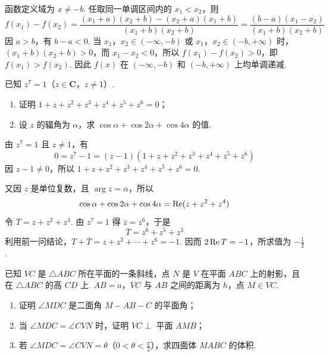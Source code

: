 \begin{solution}
函数定义域为 \(x\neq-b\). 任取同一单调区间内的 \(x_1<x_2\)，则
\[
f(x_1)-f(x_2)=\frac{(x_1+a)(x_2+b)-(x_2+a)(x_1+b)}{(x_1+b)(x_2+b)}=\frac{(b-a)(x_1-x_2)}{(x_1+b)(x_2+b)}
\]
因 \(a>b\)，有 \(b-a<0\). 当 \(x_1\)，\(x_2\in(-\infty,-b)\) 或 \(x_1\)，\(x_2\in(-b,+\infty)\) 时，\((x_1+b)(x_2+b)>0\)，而 \(x_1-x_2<0\)，所以 \(f(x_1)-f(x_2)>0\)，即 \(f(x_1)>f(x_2)\). 因此 \(f(x)\) 在 \((-\infty,-b)\) 和 \((-b,+\infty)\) 上均单调递减.
\end{solution}

\begin{problem}
已知 \(z^{7}=1\)（\(z\in\mathbf{C}\)，\(z\neq1\)）.
\begin{enumerate}
\item 证明 \(1 + z + z^2 + z^3 + z^4 + z^5 + z^6 = 0\)；
\item 设 \(z\) 的辐角为 \(\alpha\)，求 \(\cos \alpha + \cos 2\alpha + \cos 4\alpha\) 的值.
\end{enumerate}
\end{problem}

\begin{solution}
由 \(z^7=1\) 且 \(z\neq1\)，有
\[
0=z^7-1=(z-1)(1+z+z^2+z^3+z^4+z^5+z^6)
\]
因 \(z-1\neq0\)，所以 \(1+z+z^2+z^3+z^4+z^5+z^6=0\).

又因 \(z\) 是单位复数，且 \(\arg z=\alpha\)，所以
\[
\cos\alpha+\cos2\alpha+\cos4\alpha=\mathop{\rm Re}(z+z^2+z^4)
\]
令 \(T=z+z^2+z^4\). 由 \(z^7=1\) 得 \(\overline z=z^6\)，于是
\[
\overline T=z^6+z^5+z^3
\]
利用前一问结论，\(T+\overline T=z+z^2+\cdots+z^6=-1\). 因而 \(2\mathop{\rm Re}T=-1\)，所求值为 \(-\frac12\).
\end{solution}

\begin{problem}
已知 \(VC\) 是 \(\triangle ABC\) 所在平面的一条斜线，点 \(N\) 是 \(V\) 在平面 \(ABC\) 上的射影，且在 \(\triangle ABC\) 的高 \(CD\) 上. \(AB = a\)，\(VC\) 与 \(AB\) 之间的距离为 \(h\)，点 \(M \in VC\).
\begin{enumerate}
\item 证明 \(\angle MDC\) 是二面角 \(M - AB - C\) 的平面角；
\item 当 \(\angle MDC = \angle CVN\) 时，证明 \(VC \perp\) 平面 \(AMB\)；
\item 若 \(\angle MDC = \angle CVN = \theta\)（\(0 < \theta < \frac{\pi}{2}\)），求四面体 \(MABC\) 的体积.
\end{enumerate}
\end{problem}

